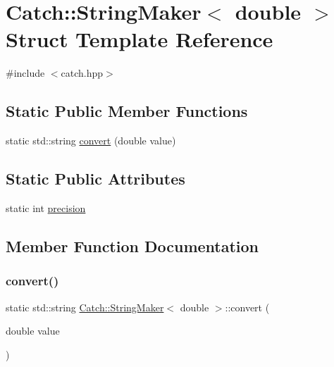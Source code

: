 \hypertarget{struct_catch_1_1_string_maker_3_01double_01_4}{}\section{Catch\+::String\+Maker$<$ double $>$ Struct Template Reference}
\label{struct_catch_1_1_string_maker_3_01double_01_4}


{\ttfamily \#include $<$catch.\+hpp$>$}

\subsection*{Static Public Member Functions}
\begin{DoxyCompactItemize}
\item 
static std\+::string \mbox{\hyperlink{struct_catch_1_1_string_maker_3_01double_01_4_acaa61529acad2462292c747d34e5f3d2}{convert}} (double value)
\end{DoxyCompactItemize}
\subsection*{Static Public Attributes}
\begin{DoxyCompactItemize}
\item 
static int \mbox{\hyperlink{struct_catch_1_1_string_maker_3_01double_01_4_a15fa2b093c532ece7f1d0c713ebaee67}{precision}}
\end{DoxyCompactItemize}


\subsection{Member Function Documentation}
\mbox{\label{struct_catch_1_1_string_maker_3_01double_01_4_acaa61529acad2462292c747d34e5f3d2}} 
\subsubsection{\texorpdfstring{convert()}{convert()}}
{\footnotesize\ttfamily static std\+::string \mbox{\hyperlink{struct_catch_1_1_string_maker}{Catch\+::\+String\+Maker}}$<$ double $>$\+::convert (\begin{DoxyParamCaption}\item[{double}]{value }\end{DoxyParamCaption})\hspace{0.3cm}{\ttfamily [static]}}



